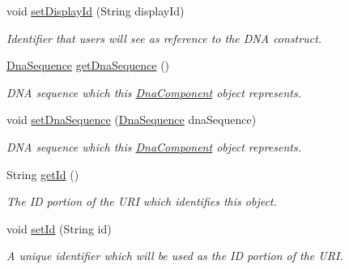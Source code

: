 \begin{DoxyCompactItemize}
void \hyperlink{classorg_1_1sbolstandard_1_1lib_s_b_o_lj_1_1_dna_component_a46b93a70e7bd612a7b429aac4829bc88}{setDisplayId} (String displayId)
\begin{DoxyCompactList}\small\item\em Identifier that users will see as reference to the DNA construct. \item\end{DoxyCompactList}\item 
\hyperlink{classorg_1_1sbolstandard_1_1lib_s_b_o_lj_1_1_dna_sequence}{DnaSequence} \hyperlink{classorg_1_1sbolstandard_1_1lib_s_b_o_lj_1_1_dna_component_a596826001de0d3a682c2effa7fd6d50d}{getDnaSequence} ()
\begin{DoxyCompactList}\small\item\em DNA sequence which this \hyperlink{classorg_1_1sbolstandard_1_1lib_s_b_o_lj_1_1_dna_component}{DnaComponent} object represents. \item\end{DoxyCompactList}\item 
void \hyperlink{classorg_1_1sbolstandard_1_1lib_s_b_o_lj_1_1_dna_component_a2e16af0dece16378b9ee31d818bd8ef1}{setDnaSequence} (\hyperlink{classorg_1_1sbolstandard_1_1lib_s_b_o_lj_1_1_dna_sequence}{DnaSequence} dnaSequence)
\begin{DoxyCompactList}\small\item\em DNA sequence which this \hyperlink{classorg_1_1sbolstandard_1_1lib_s_b_o_lj_1_1_dna_component}{DnaComponent} object represents. \item\end{DoxyCompactList}\item 
String \hyperlink{classorg_1_1sbolstandard_1_1lib_s_b_o_lj_1_1_dna_component_aab219518f0eaf3db55b6a62ad6b49407}{getId} ()
\begin{DoxyCompactList}\small\item\em The ID portion of the URI which identifies this object. \item\end{DoxyCompactList}\item 
void \hyperlink{classorg_1_1sbolstandard_1_1lib_s_b_o_lj_1_1_dna_component_a0baf110c74c46a69b4c7a93bb68001b4}{setId} (String id)
\begin{DoxyCompactList}\small\item\em A unique identifier which will be used as the ID portion of the URI. \item\end{DoxyCompactList}\item 

\end{DoxyCompactItemize}

